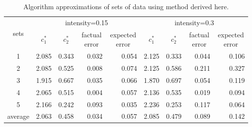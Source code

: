 \begin{table}[h!]
\centering
\caption{Algorithm approximations of sets of data using method derived here.}
\label{my-label}
\begin{tabular}{|c|r|r|r|r|r|r|r|r|}
\multirow{2}{*}{sets} & \multicolumn{4}{c|}{intensity=0.15}                                                                                                            & \multicolumn{4}{c|}{intensity=0.3}                                                                                                             \\
                      & \multicolumn{1}{c|}{$c_{1}^{*}$} & \multicolumn{1}{c|}{$c_{2}^{*}$} & \multicolumn{1}{c|}{factual error} & \multicolumn{1}{c|}{expected error} & \multicolumn{1}{c|}{$c_{1}^{*}$} & \multicolumn{1}{c|}{$c_{2}^{*}$} & \multicolumn{1}{c|}{factual error} & \multicolumn{1}{c|}{expected error} \\
1                     & 2.085                            & 0.343                            & 0.032                              & 0.054                               & 2.125                            & 0.333                            & 0.044                              & 0.106                               \\
2                     & 2.085                            & 0.525                            & 0.008                              & 0.074                               & 2.125                            & 0.586                            & 0.211                              & 0.327                               \\
3                     & 1.915                            & 0.667                            & 0.035                              & 0.066                               & 1.870                            & 0.697                            & 0.054                              & 0.119                               \\
4                     & 2.065                            & 0.515                            & 0.004                              & 0.057                               & 2.136                            & 0.535                            & 0.019                              & 0.094                               \\
5                     & 2.166                            & 0.242                            & 0.093                              & 0.035                               & 2.236                            & 0.253                            & 0.117                              & 0.064                               \\
average               & 2.063                            & 0.458                            & 0.034                              & 0.057                               & 2.085                            & 0.479                            & 0.089                              & 0.142                              
\end{tabular}
\end{table}
